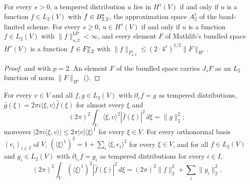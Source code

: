 \begin{corollary}[$H^s = \Besov{s}{2}{2}$]
\label{cor:sobolev-two-besov}
\leanok
{}
For every $s > 0$, a tempered distribution $u$ lies in $H^s(V)$ if and only if $u$ is a function
$f \in L_2(V)$ with $f \in B^{s}_{2,2}$, the approximation space $A^s_2$ of the
band-limited scheme. For every $s \geq 0$, $u \in H^s(V)$ if and only if $u$ is a function
$f \in L_2(V)$ with $\|f\|^{\mathrm{LP}}_{s,2} < \infty$, and every element $F$ of Mathlib's
bundled space $H^s(V)$ is a function $f \in F^{s}_{2,2}$ with
$\|f\|_{F^s_{2,2}} \leq (2 \cdot 4^s)^{1/2} \|F\|_{H^s}$.
\end{corollary}

\begin{proof}
\leanok
{} and  with $p = 2$. An element $F$
of the bundled space carries $J_s F$ as an $L_2$ function of norm $\|F\|_{H^s}$
().
\end{proof}

\begin{lemma}
\label{lem:derivative-fourier-l2}
\leanok
{}
For every $v \in V$ and all $f, g \in L_2(V)$ with $\partial_v f = g$ as tempered distributions,
$\widehat g(\xi) = 2 \pi i \langle \xi, v \rangle \widehat f(\xi)$ for almost every $\xi$ and
\[
  (2\pi)^2 \int_V \langle \xi, v \rangle^2 |\widehat f(\xi)|^2 \, d\xi = \|g\|_2^2 ;
\]
moreover $|2 \pi i \langle \xi, v \rangle| \leq 2 \pi |v| \langle \xi \rangle^1$ for every
$\xi \in V$. For every orthonormal basis $(e_i)_{i \in I}$ of $V$,
$(\langle \xi \rangle^1)^2 = 1 + \sum_i \langle \xi, e_i \rangle^2$ for every $\xi \in V$, and
for all $f \in L_2(V)$ and $g_i \in L_2(V)$ with $\partial_{e_i} f = g_i$ as tempered
distributions for every $i \in I$,
\[
  (2\pi)^2 \int_V (\langle \xi \rangle^1)^2 |\widehat f(\xi)|^2 \, d\xi
  = (2\pi)^2 \|f\|_2^2 + \sum_i \|g_i\|_2^2 .
\]
\end{lemma}

